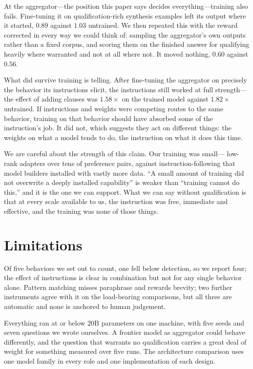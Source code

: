 \documentclass[11pt]{article}
\begin{document}
At the aggregator---the position this paper says decides everything---training
also fails. Fine-tuning it on qualification-rich synthesis examples left its
output where it started, $0.89$ against $1.03$ untrained. We then repeated
this with the reward corrected in every way we could think of: sampling the
aggregator's own outputs rather than a fixed corpus, and scoring them on the
finished answer for qualifying heavily where warranted and not at all where
not. It moved nothing, $0.60$ against $0.56$.

What did survive training is telling. After fine-tuning the aggregator on
precisely the behavior its instructions elicit, the instructions still worked
at full strength---the effect of adding clauses was $1.58\times$ on the
trained model against $1.82\times$ untrained. If instructions and weights were
competing routes to the same behavior, training on that behavior should have
absorbed some of the instruction's job. It did not, which suggests they act on
different things: the weights on what a model tends to do, the instruction on
what it does this time.

We are careful about the strength of this claim. Our training was small---
low-rank adapters over tens of preference pairs, against instruction-following
that model builders installed with vastly more data. ``A small amount of
training did not overwrite a deeply installed capability'' is weaker than
``training cannot do this,'' and it is the one we can support. What we can say
without qualification is that at every scale available to us, the instruction
was free, immediate and effective, and the training was none of those things.

\section{Limitations}
Of five behaviors we set out to count, one fell below detection, so we report
four; the effect of instructions is clear in combination but not for any
single behavior alone. Pattern matching misses paraphrase and rewards brevity;
two further instruments agree with it on the load-bearing comparisons, but all
three are automatic and none is anchored to human judgement.

Everything ran at or below 20B parameters on one machine, with five seeds and
seven questions we wrote ourselves. A frontier model as aggregator could
behave differently, and the question that warrants no qualification carries a
great deal of weight for something measured over five runs. The architecture
comparison uses one model family in every role and one implementation of each
design.
\end{document}
